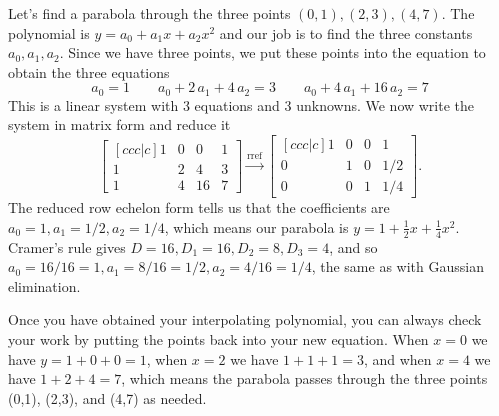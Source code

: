 \begin{example}
Let's find a parabola through the three points $(0, 1), (2, 3), (4, 7)$.  The polynomial is $y=a_0 +a_1 x+a_2 x^2$ and our job is to find the three constants $a_0, a_1, a_2$.  Since we have three points, we put these points into the equation to obtain the three equations
$$
a_{{0}}=1 \quad \quad 
a_{{0}}+2\,a_{{1}}+4\,a_{{2}}=3 \quad \quad 
a_{{0}}+4\,a_{{1}}+16\,a_{{2}}=7
$$
This is a linear system with 3 equations and 3 unknowns.  We now write the system in matrix form and reduce it
$$
\begin{bmatrix}[ccc|c] 
1&0&0&1\\
1&2&4&3\\
1&4&16&7
\end {bmatrix}
\xrightarrow{\text{rref}}
\begin{bmatrix}[ccc|c]
1&0&0&1\\
0&1&0&1/2\\
0&0&1&1/4
\end {bmatrix} 
.$$
The reduced row echelon form tells us that the coefficients are $a_0 = 1, a_1= 1/2, a_2=1/4$, which means our parabola is $y=1+\frac12 x+ \frac 14 x^2$. Cramer's rule gives $D=16, D_1=16, D_2=8, D_3=4$, and so $a_0 = 16/16=1, a_1=8/16=1/2, a_2=4/16=1/4$, the same as with Gaussian elimination. 

Once you have obtained your interpolating polynomial, you can always check your work by putting the points back into your new equation. When $x=0$ we have $y=1+0+0=1$, when $x=2$ we have $1+1+1=3$, and when $x=4$ we have $1+2+4=7$, which means the parabola passes through the three points (0,1), (2,3), and (4,7) as needed.  
\end{example}

